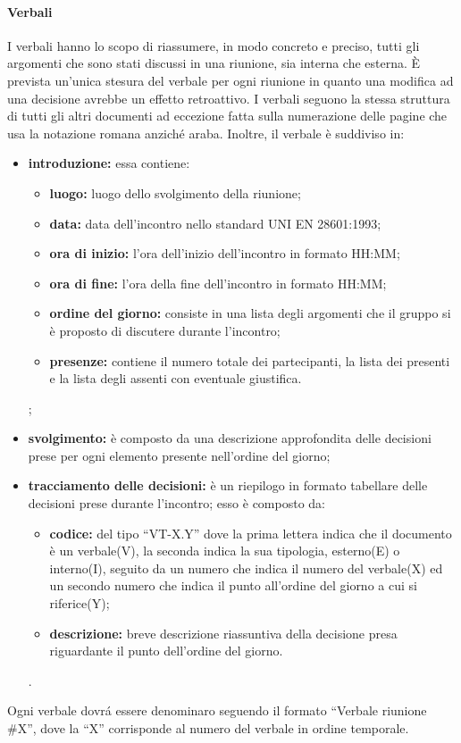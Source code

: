 			\paragraph{Verbali}
				I verbali hanno lo scopo di riassumere, in modo concreto e preciso, tutti gli argomenti che sono stati discussi in una riunione, sia interna che esterna. È prevista un'unica stesura del verbale per ogni riunione in quanto una modifica ad una decisione avrebbe un effetto retroattivo. I verbali seguono la stessa struttura di tutti gli altri documenti ad eccezione fatta sulla numerazione delle pagine che usa la notazione romana anziché araba. Inoltre, il verbale è suddiviso in:
				\begin{itemize}
					\item \textbf{introduzione:} essa contiene:
						\begin{itemize}
							\item \textbf{luogo:} luogo dello svolgimento della riunione;
							\item \textbf{data:} data dell'incontro nello standard UNI EN 28601:1993;
							\item \textbf{ora di inizio:} l'ora dell'inizio dell'incontro in formato HH:MM;
							\item \textbf{ora di fine:} l'ora della fine dell'incontro in formato HH:MM;
							\item \textbf{ordine del giorno:} consiste in una lista degli argomenti che il gruppo si è proposto di discutere durante l'incontro;
							\item \textbf{presenze:} contiene il numero totale dei partecipanti, la lista dei presenti e la lista degli assenti con eventuale giustifica.
						\end{itemize};
					\item \textbf{svolgimento:} è composto da una descrizione approfondita delle decisioni prese per ogni elemento 					presente nell'ordine del giorno;
					\item \textbf{tracciamento delle decisioni:} è un riepilogo in formato tabellare delle decisioni prese durante l'incontro; esso è composto da:
						\begin{itemize}
							\item \textbf{codice:} del tipo ``VT-X.Y'' dove la prima lettera indica che il documento è un verbale(V), la seconda indica la sua tipologia, esterno(E) o interno(I), seguito da un numero che indica il numero del verbale(X) ed un secondo numero che indica il punto all'ordine del giorno a cui si riferice(Y);
							\item \textbf{descrizione:} breve descrizione riassuntiva della decisione presa riguardante il punto dell'ordine del giorno.
					\end{itemize}.
				\end{itemize}
				Ogni verbale dovrá essere denominaro seguendo il formato ``Verbale riunione \#X'', dove la ``X'' corrisponde al numero del verbale in ordine temporale.
